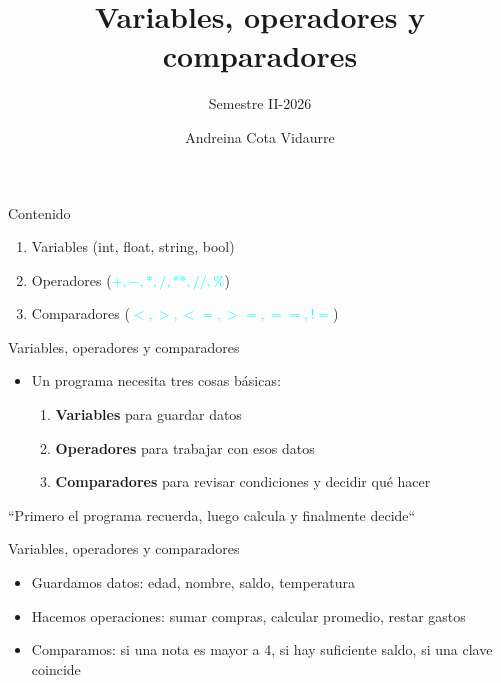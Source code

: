 \documentclass{beamer}
\title{Variables, operadores y comparadores} %
\subtitle{Semestre II-2026} %
\author{Andreina Cota Vidaurre}
\begin{document}
  \shorthandoff{-}
  \frame[c]{\maketitle}


    \begin{frame}[fragile,t]{Contenido}
        \begin{enumerate}
            \item Variables (int, float, string, bool)
            \item Operadores (\textcolor{cyan}{$+, -, *, /, **, //, \%$})
            \item Comparadores (\textcolor{cyan}{$<, >, <=, >=, ==, !=$})
        \end{enumerate}
    \end{frame}

    \begin{frame}{Variables, operadores y comparadores}
         \begin{itemize}
             \item Un programa necesita tres cosas básicas:
             \begin{enumerate}
                 \item \textbf{Variables} para guardar datos
                 \item \textbf{Operadores} para trabajar con esos datos
                 \item \textbf{Comparadores} para revisar condiciones y decidir qué hacer
             \end{enumerate}
         \end{itemize}

         ``Primero el programa recuerda, luego calcula y finalmente decide``
    \end{frame}

    \begin{frame}{Variables, operadores y comparadores}
         \begin{itemize}
             \item Guardamos datos: edad, nombre, saldo, temperatura
             \item Hacemos operaciones: sumar compras, calcular promedio, restar gastos
             \item Comparamos: si una nota es mayor a 4, si hay suficiente saldo, si una clave coincide
         \end{itemize}
    \end{frame}
\end{document}
